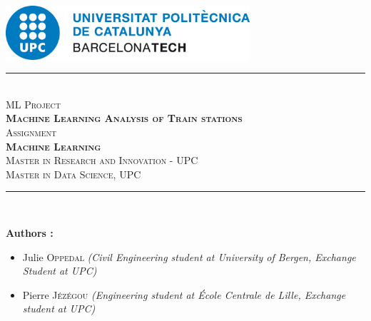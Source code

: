 \pagestyle{plain}
\pagecolor{white}


\vfill

\color{black}
\begin{center}
    \includegraphics[height=2cm]{assets/images/upc_logo.jpeg} \\
    \vfill
    \rule{\linewidth}{0.5mm} \\[1cm]
    {\Huge \textsc{\textcolor{fib_red}{ML Project}}}\\[0.5cm]
    {\Large \textsc{\textbf{Machine Learning Analysis of Train stations}}}\\[1cm]
    {\Large \textsc{Assignment}}\\[0.4cm]
    {\huge \textsc{\textbf{Machine Learning}}}\\[1cm]
    {\large \textsc{Master in Research and Innovation - UPC\\Master in Data Science, UPC}}\\[0.4cm]
    \rule{\linewidth}{0.5mm} \\[1.5cm]
\end{center}

\vfill

\textbf{Authors :}
\begin{itemize}
    \item Julie \textsc{Oppedal}\newline
    \textit{(Civil Engineering student at University of Bergen, Exchange Student at UPC)}
    \item Pierre \textsc{Jézégou}\newline
    \textit{(Engineering student at École Centrale de Lille, Exchange student at UPC)}
\end{itemize}

\newpage
\color{black}
\pagecolor{white}
\pagestyle{fancy}